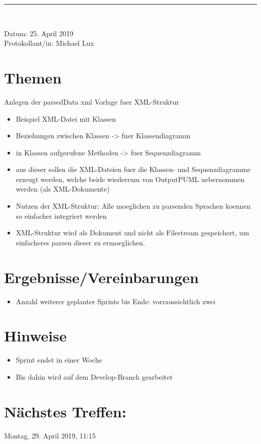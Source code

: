\pagebreak
\begin{center}  
\vspace{0.5pt}\nointerlineskip\rule{\textwidth}{0.2pt}\\ 
\vspace{0.5pt}\nointerlineskip
\end{center} 
\large Datum: 25. April 2019\vspace{3pt}\\\large Protokollant/in: Michael Lux
\section*{Themen}
Anlegen der parsedData xml Vorlage fuer XML-Struktur
\begin{itemize}

\item Beispiel XML-Datei mit Klassen
\item Beziehungen zwischen Klassen -> fuer Klassendiagramm
\item in Klassen aufgerufene Methoden -> fuer Sequenzdiagramm

\item aus dieser sollen die XML-Dateien fuer die Klassen- und Sequenzdiagramme erzeugt werden, welche beide wiederrum von OutputPUML uebernommen werden (als XML-Dokumente)

\item Nutzen der XML-Struktur: Alle moeglichen zu parsenden Sprachen koennen so einfacher integriert werden 

\item XML-Struktur wird als Dokument und nicht als Filestream gespeichert, um einfacheres parsen dieser zu ermoeglichen.



\end{itemize}


\section*{Ergebnisse/Vereinbarungen}
\begin{itemize}
\item Anzahl weiterer geplanter Sprints bis Ende: vorraussichtlich zwei
\end{itemize}
\section*{Hinweise}
\begin{itemize}
\item Sprint endet in einer Woche
\item Bis dahin wird auf dem Develop-Branch gearbeitet
\end{itemize}
\section*{Nächstes Treffen:}
Montag, 29. April 2019, 11:15




